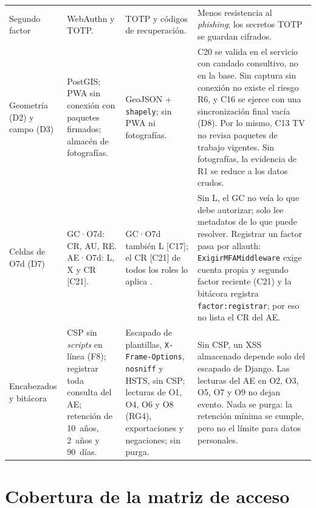 \documentclass[10pt,letterpaper]{article}
\newcommand{\cod}[1]{\texttt{#1}}
\begin{document}
\begin{small}
\begin{longtable}{@{}P{2.6cm}P{3.6cm}P{3.6cm}P{6.4cm}@{}}
\footnotesize Segundo factor & \footnotesize WebAuthn y TOTP. & \footnotesize TOTP y códigos de recuperación. & \footnotesize Menos resistencia al \emph{phishing}; los secretos TOTP se guardan cifrados.\\
\footnotesize Geometría (D2) y campo (D3) & \footnotesize PostGIS; PWA sin conexión con paquetes firmados; almacén de fotografías. & \footnotesize GeoJSON + \cod{shapely}; sin PWA ni fotografías. & \footnotesize C20 se valida en el servicio con candado consultivo, no en la base. Sin captura sin conexión no existe el riesgo R6, y C16 se ejerce con una sincronización final vacía (D8). Por lo mismo, C13 TV no revisa paquetes de trabajo vigentes. Sin fotografías, la evidencia de R1 se reduce a los datos crudos.\\
\footnotesize Celdas de O7d (D7) & \footnotesize GC·O7d: CR, AU, RE. AE·O7d: L, X y CR [C21]. & \footnotesize GC·O7d también L [C17]; el CR [C21] de todos los roles lo aplica . & \footnotesize Sin L, el GC no veía lo que debe autorizar; solo lee metadatos de lo que puede resolver. Registrar un factor pasa por allauth: \cod{ExigirMFAMiddleware} exige cuenta propia y segundo factor reciente (C21) y la bitácora registra \cod{factor:registrar}; por eso  no lista el CR del AE.\\
\footnotesize Encabezados y bitácora & \footnotesize CSP sin \emph{scripts} en línea (F8); registrar toda consulta del AE; retención de 10~años, 2~años y 90~días. & \footnotesize Escapado de plantillas, \cod{X-Frame-Options}, \cod{nosniff} y HSTS, sin CSP; lecturas de O1, O4, O6 y O8 (RG4), exportaciones y negaciones; sin purga. & \footnotesize Sin CSP, un XSS almacenado depende solo del escapado de Django. Las lecturas del AE en O2, O3, O5, O7 y O9 no dejan evento. Nada se purga: la retención mínima se cumple, pero no el límite para datos personales.\\
\bottomrule
\end{longtable}
\end{small}

\section{Cobertura de la matriz de acceso}
\label{sec:cobertura}
\end{document}
